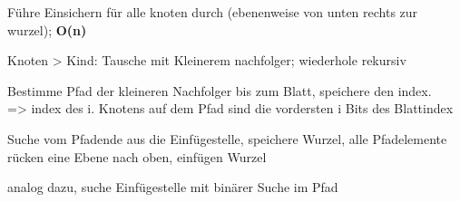 Führe Einsichern für alle knoten durch (ebenenweise von unten rechts zur wurzel); \textbf{O(n)}

Knoten > Kind: Tausche mit Kleinerem nachfolger; wiederhole rekursiv

Bestimme Pfad der kleineren Nachfolger bis zum Blatt, speichere den index.\\ 
=> index des i. Knotens auf dem Pfad sind die vordersten i Bits des Blattindex

Suche vom Pfadende aus die Einfügestelle, speichere Wurzel, alle Pfadelemente rücken eine Ebene nach oben, einfügen Wurzel

 analog dazu, suche Einfügestelle mit binärer Suche im Pfad 



